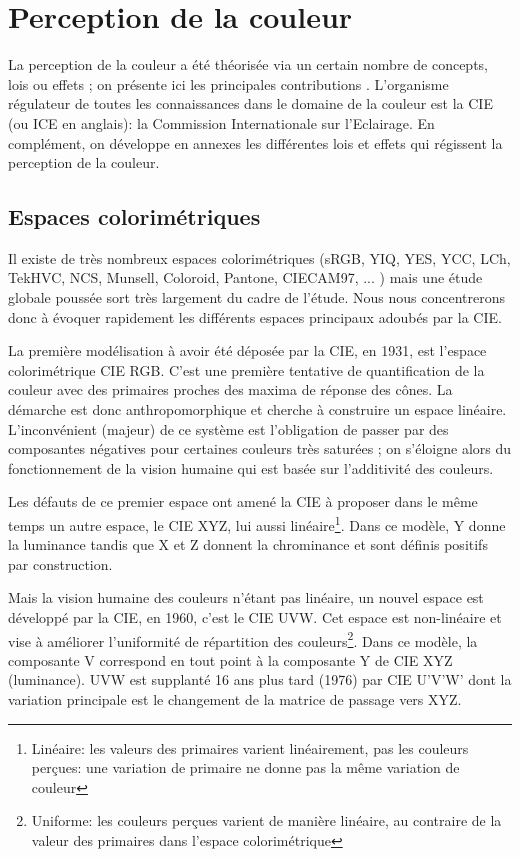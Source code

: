 \chapter{Perception de la couleur}
	\par La perception de la couleur a été théorisée via un certain nombre de concepts, lois ou effets ; on présente ici les principales contributions \citep{le_grand_optique_1972, wyszecki_color_2000,judd_color_1975}. L'organisme régulateur de toutes les connaissances dans le domaine de la couleur est la CIE (ou ICE en anglais): la Commission Internationale sur l'Eclairage. En complément, on développe en annexes les différentes lois et effets qui régissent la perception de la couleur.
	
	\section{Espaces colorimétriques}
	\par Il existe de très nombreux espaces colorimétriques (sRGB, YIQ, YES, YCC, LCh, TekHVC, NCS, Munsell, Coloroid, Pantone, CIECAM97, ... \citep{beretta_understanding_2000}) mais une étude globale poussée sort très largement du cadre de l'étude. Nous nous concentrerons donc à évoquer rapidement les différents espaces principaux adoubés par la CIE.
	
	\par La première modélisation à avoir été déposée par la CIE, en 1931, est l'espace colorimétrique CIE RGB. C'est une première tentative de quantification de la couleur avec des primaires proches des maxima de réponse des cônes. La démarche est donc anthropomorphique et cherche à construire un espace linéaire. L'inconvénient (majeur) de ce système est l'obligation de passer par des composantes négatives pour certaines couleurs très saturées ; on s'éloigne alors du fonctionnement de la vision humaine qui est basée sur l'additivité des couleurs.
	
	\par Les défauts de ce premier espace ont amené la CIE à proposer dans le même temps un autre espace, le CIE XYZ, lui aussi linéaire\footnote{Linéaire: les valeurs des primaires varient linéairement, pas les couleurs perçues: une variation de primaire ne donne pas la même variation de couleur}. Dans ce modèle, Y donne	la luminance tandis que X et Z donnent la chrominance et sont définis positifs par construction.
	
	\par Mais la vision humaine des couleurs n'étant pas linéaire, un nouvel espace est développé par la CIE, en 1960, c'est le CIE UVW. Cet espace est non-linéaire et vise à améliorer l'uniformité de répartition des couleurs\footnote{Uniforme: les couleurs perçues varient de manière linéaire, au contraire de la valeur des primaires dans l'espace colorimétrique}. Dans ce modèle, la composante V correspond en tout point à la composante Y de CIE XYZ (luminance). UVW est supplanté 16 ans plus tard (1976) par CIE U'V'W' dont la variation principale est le changement de la matrice de passage vers XYZ.
	
